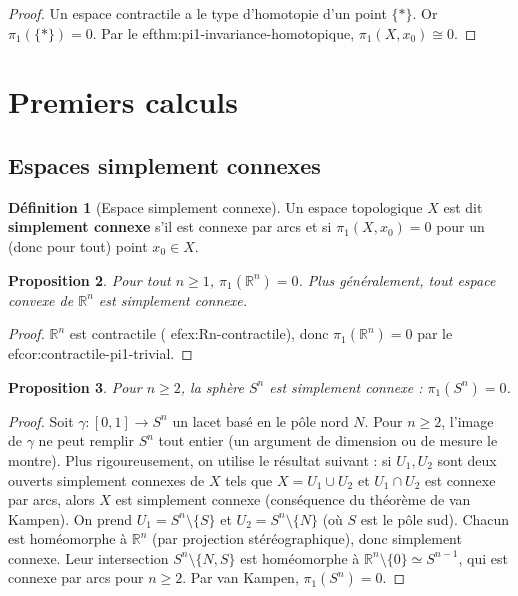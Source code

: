 \documentclass[12pt,a4paper,openany]{book}
\theoremstyle{definition}
\newtheorem{definition}{Définition}[chapter]
\theoremstyle{plain}
\newtheorem{proposition}[definition]{Proposition}
\theoremstyle{remark}
\newcommand{\R}{\mathbb{R}}
\begin{document}
\begin{proof}
Un espace contractile a le type d'homotopie d'un point $\{*\}$. Or
$\pi_1(\{*\}) = 0$. Par le 
ef{thm:pi1-invariance-homotopique},
$\pi_1(X, x_0) \cong 0$.
\end{proof}

\section{Premiers calculs}\label{sec:premiers-calculs}

\subsection{Espaces simplement connexes}\label{subsec:simplement-connexe}

\begin{definition}[Espace simplement connexe]\label{def:simplement-connexe}
Un espace topologique $X$ est dit \textbf{simplement connexe} s'il est connexe
par arcs et si $\pi_1(X, x_0) = 0$ pour un (donc pour tout) point $x_0 \in X$.
\end{definition}

\begin{proposition}\label{prop:pi1-Rn}
Pour tout $n \geqslant 1$, $\pi_1(\R^n) = 0$. Plus généralement, tout espace
convexe de $\R^n$ est simplement connexe.
\end{proposition}

\begin{proof}
$\R^n$ est contractile (
ef{ex:Rn-contractile}), donc
$\pi_1(\R^n) = 0$ par le 
ef{cor:contractile-pi1-trivial}.
\end{proof}

\begin{proposition}\label{prop:pi1-Sn}
Pour $n \geqslant 2$, la sphère $S^n$ est simplement connexe :
$\pi_1(S^n) = 0$.
\end{proposition}

\begin{proof}
Soit $\gamma : [0,1] \to S^n$ un lacet basé en le pôle nord $N$.
Pour $n \geqslant 2$, l'image de $\gamma$ ne peut remplir $S^n$ tout entier
(un argument de dimension ou de mesure le montre). Plus rigoureusement, on
utilise le résultat suivant : si $U_1, U_2$ sont deux ouverts simplement connexes
de $X$ tels que $X = U_1 \cup U_2$ et $U_1 \cap U_2$ est connexe par arcs,
alors $X$ est simplement connexe (conséquence du théorème de van
Kampen). On prend $U_1 = S^n \setminus \{S\}$ et
$U_2 = S^n \setminus \{N\}$ (où $S$ est le pôle sud). Chacun est homéomorphe à
$\R^n$ (par projection stéréographique), donc simplement connexe. Leur
intersection $S^n \setminus \{N, S\}$ est homéomorphe à
$\R^n \setminus \{0\} \simeq S^{n-1}$, qui est connexe par arcs pour
$n \geqslant 2$. Par van Kampen, $\pi_1(S^n) = 0$.
\end{proof}
\end{document}
